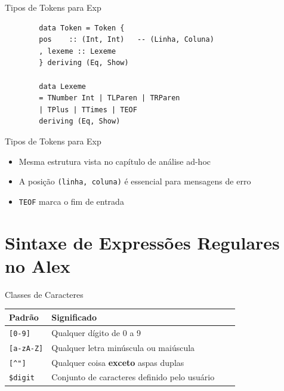 \begin{frame}[fragile]{Tipos de Tokens para Exp}

    \begin{lstlisting}
        data Token = Token {
        pos    :: (Int, Int)   -- (Linha, Coluna)
        , lexeme :: Lexeme
        } deriving (Eq, Show)

        data Lexeme
        = TNumber Int | TLParen | TRParen
        | TPlus | TTimes | TEOF
        deriving (Eq, Show)
    \end{lstlisting}
\end{frame}

\begin{frame}[fragile]{Tipos de Tokens para Exp}

    \begin{itemize}

        \item
        Mesma estrutura vista no capítulo de análise ad-hoc
        \item
        A posição \texttt{(linha, coluna)} é essencial para
        mensagens de erro
        \item
        \texttt{TEOF} marca o fim de entrada
    \end{itemize}
\end{frame}


\section{Sintaxe de Expressões Regulares no
Alex}\label{sintaxe-de-expressuxf5es-regulares-no-alex}

\begin{frame}[fragile]{Classes de Caracteres}

    \begin{table}
        \begin{tabular}{l l l l}
            \hline
            Padrão & Significado \\
            \hline
            \texttt{[0-9]} & Qualquer dígito de 0 a 9 \\
            \texttt{[a-zA-Z]} & Qualquer letra minúscula ou
            maiúscula \\
            \verb|[^"]| & Qualquer coisa \textbf{exceto} aspas
            duplas \\
            \verb|$digit| & Conjunto de caracteres definido pelo
            usuário \\
            \hline
        \end{tabular}
    \end{table}
\end{frame}

